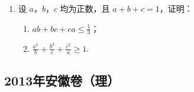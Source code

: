 \begin{description}
\begin{enumerate}[leftmargin=5pt]
        \item 设 \(a\)，\(b\)，\(c\) 均为正数，且 \(a + b + c = 1\)，证明：
\begin{enumerate}
\item \(ab + bc + ca \leqslant \frac{1}{3}\)；
\item \(\frac{a^2}{b} + \frac{b^2}{c} + \frac{c^2}{a} \geqslant 1\).
\end{enumerate}

    \end{enumerate}

\end{description}


\subsection{2013年安徽卷（理）}\label{gk:2013年安徽卷（理）}

